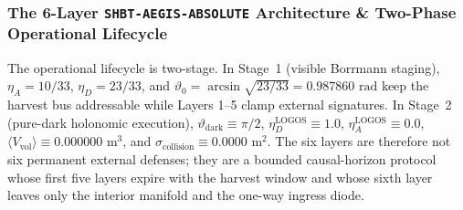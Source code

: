 \documentclass[11pt,onecolumn]{article}
\begin{document}
\subsubsection{The 6-Layer \texttt{SHBT-AEGIS-ABSOLUTE} Architecture \& Two-Phase Operational Lifecycle}
\label{subsec:aegis_6layer_lifecycle}

The operational lifecycle is two-stage. In Stage~1 (visible Borrmann staging), $\eta_A=10/33$, $\eta_D=23/33$, and $\vartheta_0=\arcsin\sqrt{23/33}=0.987860\text{ rad}$ keep the harvest bus addressable while Layers 1--5 clamp external signatures. In Stage~2 (pure-dark holonomic execution), $\vartheta_{\text{dark}}\equiv\pi/2$, $\eta_D^{\text{LOGOS}}\equiv1.0$, $\eta_A^{\text{LOGOS}}\equiv0.0$, $\langle V_{\text{vol}}\rangle\equiv0.000000\text{ m}^3$, and $\sigma_{\text{collision}}\equiv0.0000\text{ m}^2$. The six layers are therefore not six permanent external defenses; they are a bounded causal-horizon protocol whose first five layers expire with the harvest window and whose sixth layer leaves only the interior manifold and the one-way ingress diode.
\end{document}
